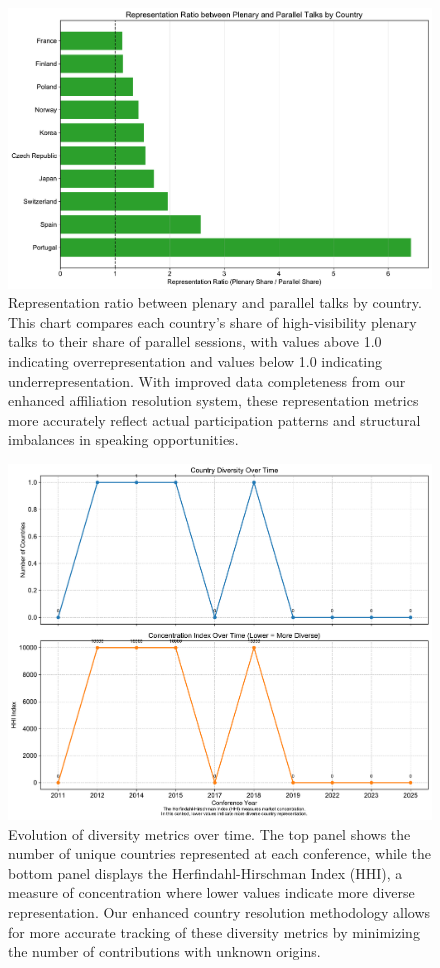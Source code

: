 \documentclass[a4paper,11pt]{article}
\begin{document}
\begin{figure}[H]
\centering
\includegraphics[width=\textwidth]{figures/representation_ratio.pdf}
\caption{Representation ratio between plenary and parallel talks by country. This chart compares each country's share of high-visibility plenary talks to their share of parallel sessions, with values above 1.0 indicating overrepresentation and values below 1.0 indicating underrepresentation. With improved data completeness from our enhanced affiliation resolution system, these representation metrics more accurately reflect actual participation patterns and structural imbalances in speaking opportunities.}
\label{fig:representation_ratio}
\end{figure}

\begin{figure}[H]
\centering
\includegraphics[width=\textwidth]{figures/diversity_metrics.pdf}
\caption{Evolution of diversity metrics over time. The top panel shows the number of unique countries represented at each conference, while the bottom panel displays the Herfindahl-Hirschman Index (HHI), a measure of concentration where lower values indicate more diverse representation. Our enhanced country resolution methodology allows for more accurate tracking of these diversity metrics by minimizing the number of contributions with unknown origins.}
\label{fig:diversity_metrics}
\end{figure}
\end{document}
